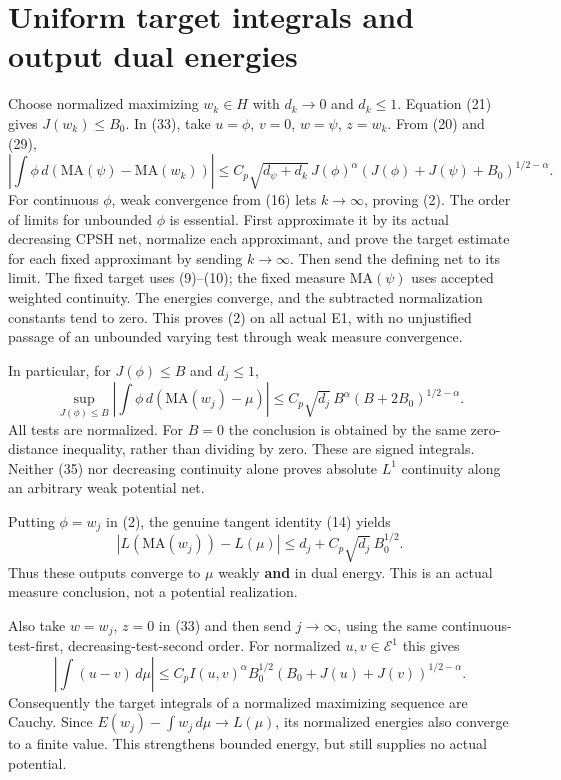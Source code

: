 \documentclass[
  10pt,
]{article}
\begin{document}
\section{Uniform target integrals and output dual
energies}\label{uniform-target-integrals-and-output-dual-energies}

Choose normalized maximizing \(w_k\in H\) with \(d_k\to0\) and
\(d_k\le1\). Equation (21) gives \(J(w_k)\le B_0\). In (33), take
\(u=\phi\), \(v=0\), \(w=\psi\), \(z=w_k\). From (20) and (29), \[
 |\int\phi\,d(\mathrm{MA}(\psi)-\mathrm{MA}(w_k))|
 \le C_p\sqrt{d_\psi+d_k}\,J(\phi)^\alpha
       (J(\phi)+J(\psi)+B_0)^{1/2-\alpha}. \tag{34}
\] For continuous \(\phi\), weak convergence from (16) lets
\(k\to\infty\), proving (2). The order of limits for unbounded \(\phi\)
is essential. First approximate it by its actual decreasing CPSH net,
normalize each approximant, and prove the target estimate for each fixed
approximant by sending \(k\to\infty\). Then send the defining net to its
limit. The fixed target uses (9)--(10); the fixed measure
\(\mathrm{MA}(\psi)\) uses accepted weighted continuity. The energies
converge, and the subtracted normalization constants tend to zero. This
proves (2) on all actual E1, with no unjustified passage of an unbounded
varying test through weak measure convergence.

In particular, for \(J(\phi)\le B\) and \(d_j\le1\), \[
 \sup_{J(\phi)\le B}\left|\int\phi\,d(\mathrm{MA}(w_j)-\mu)\right|
 \le C_p\sqrt{d_j}\,B^\alpha(B+2B_0)^{1/2-\alpha}. \tag{35}
\] All tests are normalized. For \(B=0\) the conclusion is obtained by
the same zero-distance inequality, rather than dividing by zero. These
are signed integrals. Neither (35) nor decreasing continuity alone
proves absolute \(L^1\) continuity along an arbitrary weak potential
net.

Putting \(\phi=w_j\) in (2), the genuine tangent identity (14) yields \[
 |L(\mathrm{MA}(w_j))-L(\mu)|
 \le d_j+C_p\sqrt{d_j}\,B_0^{1/2}. \tag{36}
\] Thus these outputs converge to \(\mu\) weakly \textbf{and} in dual
energy. This is an actual measure conclusion, not a potential
realization.

Also take \(w=w_j\), \(z=0\) in (33) and then send \(j\to\infty\), using
the same continuous-test-first, decreasing-test-second order. For
normalized \(u,v\in\mathcal E^1\) this gives \[
 |\int(u-v)\,d\mu|
 \le C_p I(u,v)^\alpha B_0^{1/2}
       (B_0+J(u)+J(v))^{1/2-\alpha}. \tag{37}
\] Consequently the target integrals of a normalized maximizing sequence
are Cauchy. Since \(E(w_j)-\int w_j\,d\mu\to L(\mu)\), its normalized
energies also converge to a finite value. This strengthens bounded
energy, but still supplies no actual potential.
\end{document}
